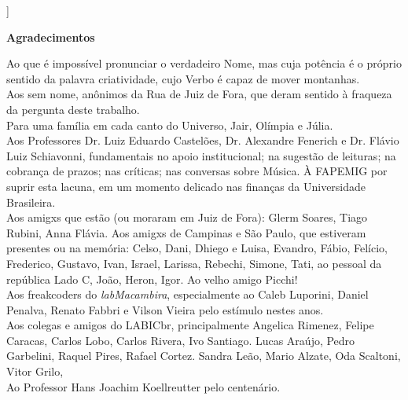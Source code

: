 ]%
\newpage
\begin{flushright}
\huge{\textbf{Agradecimentos}}

\small{Ao que é impossível pronunciar o verdadeiro Nome, mas cuja potência é o próprio sentido da palavra criatividade, cujo Verbo é capaz de mover montanhas.
\ \\
Aos sem nome, anônimos da Rua de Juiz de Fora, que deram sentido à fraqueza da pergunta deste trabalho.
\ \\
Para uma família em cada canto do Universo, Jair, Olímpia e Júlia. 
\ \\
Aos Professores Dr. Luiz Eduardo Castelões, Dr. Alexandre Fenerich e Dr. Flávio Luiz Schiavonni, fundamentais no apoio institucional; na sugestão de leituras; na cobrança de prazos; nas críticas; nas conversas sobre Música. À FAPEMIG por suprir esta lacuna, em um momento delicado nas finanças da Universidade Brasileira.
\ \\
Aos amigxs que estão (ou moraram em Juiz de Fora): Glerm Soares, Tiago Rubini, Anna Flávia. Aos amigxs de Campinas e São Paulo, que estiveram presentes ou na memória: Celso, Dani, Dhiego e Luisa, Evandro, Fábio, Felício, Frederico, Gustavo, Ivan, Israel, Larissa, Rebechi, Simone, Tati,  ao pessoal da república Lado C, João, Heron, Igor. Ao velho amigo Picchi!
\ \\
Aos freakcoders do \emph{labMacambira}, especialmente ao Caleb Luporini, Daniel Penalva, Renato Fabbri e Vilson Vieira pelo estímulo nestes anos. 
\ \\
Aos colegas e amigos do LABICbr, principalmente Angelica Rimenez, Felipe Caracas, Carlos Lobo, Carlos Rivera, 
Ivo Santiago. Lucas Araújo, Pedro Garbelini, Raquel Pires, Rafael Cortez. Sandra Leão, Mario Alzate,  Oda Scaltoni, Vitor Grilo, 
\ \\
Ao Professor Hans Joachim Koellreutter pelo centenário.}
\end{flushright}

\newpage
